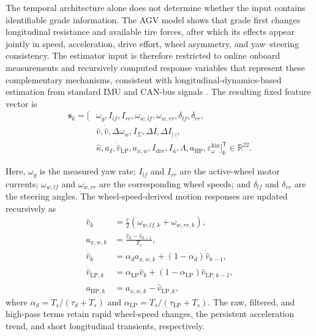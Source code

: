 \documentclass{ieeeaccess}
\newcommand{\citep}[1]{\cite{#1}}
\begin{document}
The temporal architecture alone does not determine whether the input contains identifiable grade information. The AGV model shows that grade first changes longitudinal resistance and available tire forces, after which its effects appear jointly in speed, acceleration, drive effort, wheel asymmetry, and yaw--steering consistency. The estimator input is therefore restricted to online onboard measurements and recursively computed response variables that represent these complementary mechanisms, consistent with longitudinal-dynamics-based estimation from standard IMU and CAN-bus signals \citep{Jensen2022MassGradeIMUCAN}. The resulting fixed feature vector is
\begin{equation}
\begin{aligned}
\mathbf{s}_k=\big[&
\omega_{g},I_{lf},I_{rr},\omega_{w,lf},\omega_{w,rr},
\delta_{lf},\delta_{rr},\\
&\hat v,\dot{\hat v},\Delta\omega_w,I_{\Sigma},
\Delta I,\Delta I_{|\cdot|},\\
&\hat\kappa,a_I,\dot{\hat v}_{\mathrm{LP}},a_{x,w},
I_{\mathrm{drv}},I_a,\Lambda,a_{\mathrm{HP}},\varepsilon_{\omega}^{\mathrm{kin}}
\big]_k^{\mathsf T}\in\mathbb R^{22}.
\end{aligned}
\label{eq:feature_vector_22d}
\end{equation}

Here, $\omega_g$ is the measured yaw rate; $I_{lf}$ and $I_{rr}$ are the active-wheel motor currents; $\omega_{w,lf}$ and $\omega_{w,rr}$ are the corresponding wheel speeds; and $\delta_{lf}$ and $\delta_{rr}$ are the steering angles. The wheel-speed-derived motion responses are updated recursively as
\begin{align}
\hat v_k&=\frac{r}{2}\left(\omega_{w,lf,k}+\omega_{w,rr,k}\right),\nonumber\\
a_{x,w,k}&=\frac{\hat v_k-\hat v_{k-1}}{T_s},\nonumber\\
\dot{\hat v}_k&=\alpha_d a_{x,w,k}
+(1-\alpha_d)\dot{\hat v}_{k-1},\nonumber\\
\dot{\hat v}_{\mathrm{LP},k}
&=\alpha_{\mathrm{LP}}\dot{\hat v}_k
+(1-\alpha_{\mathrm{LP}})\dot{\hat v}_{\mathrm{LP},k-1},\nonumber\\
a_{\mathrm{HP},k}&=a_{x,w,k}-\dot{\hat v}_{\mathrm{LP},k},
\label{eq:kinematic_feature_channels}
\end{align}
where $\alpha_d=T_s/(\tau_d+T_s)$ and $\alpha_{\mathrm{LP}}=T_s/(\tau_{\mathrm{LP}}+T_s)$. The raw, filtered, and high-pass terms retain rapid wheel-speed changes, the persistent acceleration trend, and short longitudinal transients, respectively.
\end{document}
